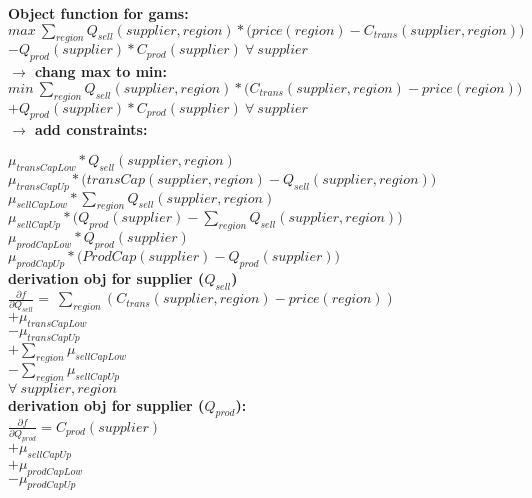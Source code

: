 \documentclass{article}
\begin{document}
\textbf{Object function for gams:}\\
\quad$ max\:\sum_{region} Q_{sell}(supplier, region) *\Big(price(region) - C_{trans}(supplier,region)\Big) $\\
\quad$- Q_{prod}(supplier)*C_{prod}(supplier)\:\forall\: supplier $\\

\textbf{$\rightarrow$ chang max to min:}\\

\quad$ min\:\sum_{region} Q_{sell}(supplier, region) *\Big(C_{trans}(supplier,region) - price(region)\Big) $\\
\quad$+ Q_{prod}(supplier)*C_{prod}(supplier)\:\forall\: supplier$ \\

\textbf{$\rightarrow$ add constraints:}

\quad$\mu_{transCapLow} * Q_{sell}(supplier, region)$\\
\quad$\mu_{transCapUp} * \Big(transCap(supplier, region) - Q_{sell}(supplier, region)\Big)$\\
\quad$\mu_{sellCapLow} * \sum_{region} Q_{sell}(supplier, region)$\\
\quad$\mu_{sellCapUp}*\Big( Q_{prod}(supplier) -\sum_{region} Q_{sell}(supplier, region)\Big)$\\
\quad$\mu_{prodCapLow} * Q_{prod}(supplier)$\\
\quad$\mu_{prodCapUp}*\Big( ProdCap(supplier) - Q_{prod}(supplier)\Big)	$\\


\textbf{derivation obj for supplier ($Q_{sell}$)}\\
\quad$\frac{\partial f}{\partial Q_{sell}} = \:\sum_{region} (C_{trans}(supplier,region) - price(region))$\\
\quad$+ \mu_{transCapLow}$\\
\quad$- \mu_{transCapUp} $\\
\quad$+ \sum_{region} \mu_{sellCapLow}$\\
\quad$- \sum_{region} \mu_{sellCapUp}$\\
\quad$\forall \:supplier,region$\\


\textbf{derivation obj for supplier ($Q_{prod}$):}\\
\quad$\frac{\partial f}{\partial Q_{prod}} = C_{prod}(supplier)\:$\\
\quad$+ \mu_{sellCapUp}$\\
\quad$+ \mu_{prodCapLow}$\\
\quad$- \mu_{prodCapUp}$\\
\end{document}
